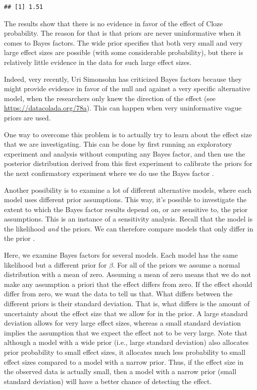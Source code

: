 \documentclass[12pt,]{krantz}
\theoremstyle{definition}
\theoremstyle{definition}
\theoremstyle{definition}
\theoremstyle{remark}
\begin{document}
\begin{verbatim}
## [1] 1.51
\end{verbatim}

The results show that there is no evidence in favor of the effect of
Cloze probability. The reason for that is that priors are never
uninformative when it comes to Bayes factors. The wide prior specifies
that both very small and very large effect sizes are possible (with some
considerable probability), but there is relatively little evidence in
the data for such large effect sizes.

Indeed, very recently, Uri Simonsohn has criticized Bayes factors
because they might provide evidence in favor of the null and against a
very specific alternative model, when the researchers only knew the
direction of the effect (see \url{https://datacolada.org/78a}). This can
happen when very uninformative vague priors are used.

One way to overcome this problem is to actually try to learn about the
effect size that we are investigating. This can be done by first running
an exploratory experiment and analysis without computing any Bayes
factor, and then use the posterior distribution derived from this first
experiment to calibrate the priors for the next confirmatory experiment
where we do use the Bayes factor \citep[see][ for a Bayes Factor test
calibrated to investigate replication
success]{verhagenBayesianTestsQuantify2014}.

Another possibility is to examine a lot of different alternative models,
where each model uses different prior assumptions. This way, it's
possible to investigate the extent to which the Bayes factor results
depend on, or are sensitive to, the prior assumptions. This is an
instance of a sensitivity analysis. Recall that the model is the
likelihood \emph{and} the priors. We can therefore compare models that
only differ in the prior \citep[for an example involving EEG and
predictability effects, see][]{nicenboim2020words}.

Here, we examine Bayes factors for several models. Each model has the
same likelihood but a different prior for \(\beta\). For all of the
priors we assume a normal distribution with a mean of zero. Assuming a
mean of zero means that we do not make any assumption a priori that the
effect differs from zero. If the effect should differ from zero, we want
the data to tell us that. What differs between the different priors is
their standard deviation. That is, what differs is the amount of
uncertainty about the effect size that we allow for in the prior. A
large standard deviation allows for very large effect sizes, whereas a
small standard deviation implies the assumption that we expect the
effect not to be very large. Note that although a model with a wide
prior (i.e., large standard deviation) also allocates prior probability
to small effect sizes, it allocates much less probability to small
effect sizes compared to a model with a narrow prior. Thus, if the
effect size in the observed data is actually small, then a model with a
narrow prior (small standard deviation) will have a better chance of
detecting the effect.
\end{document}
